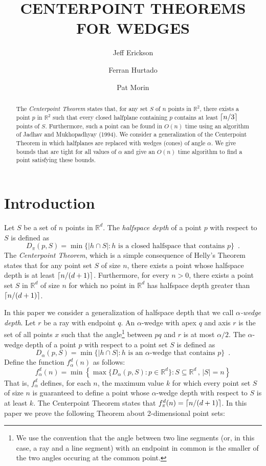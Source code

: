 \documentclass[lotsofwhite]{patmorin}
\title{\MakeUppercase{Centerpoint Theorems for Wedges}}
\author{Jeff Erickson \and
	Ferran Hurtado \and
	Pat Morin}
\date{}
\begin{document}
\maketitle

\begin{abstract}
The \emph{Centerpoint Theorem} states that, for any set $S$ of $n$
points in $\mathbb{R}^2$, there exists a point $p$ in $\mathbb{R}^2$
such that every closed halfplane containing $p$ contains at least
$\left\lceil n/3 \right\rceil$ points of $S$. Furthermore, such a point can be found in
$O(n)$ time using an algorithm of Jadhav and Mukhopadhyay (1994).  We
consider a generalization of the Centerpoint Theorem in which
halfplanes are replaced with wedges (cones) of angle $\alpha$.  We
give bounds that are tight for all values of $\alpha$ and give an
$O(n)$ time algorithm to find a point satisfying these bounds.
\end{abstract}

\section{Introduction}

Let $S$ be a set of $n$ points in $\mathbb{R}^d$.  The \emph{halfspace
depth} \cite{t75} of a point $p$ with respect to $S$ is defined as
\[
D_\pi(p,S) = 
   \min\{|h\cap S| : \mbox{$h$ is a closed halfspace that contains $p$} \}
    \enspace .
\]
The \emph{Centerpoint Theorem}, which is a simple consequence of
Helly's Theorem \cite{e93} states that for any point set $S$ of size
$n$, there exists a point whose halfspace depth is at least
$\left\lceil n/(d+1) \right\rceil$.  Furthermore, for every $n>0$, there exists a point
set $S$ in $\mathbb{R}^d$ of size $n$ for which no point in
$\mathbb{R}^d$ has halfspace depth greater than $\left\lceil n/(d+1) \right\rceil$. 

In this paper we consider a generalization of halfspace depth that we
call \emph{$\alpha$-wedge depth}. Let $r$ be a ray with endpoint $q$.
An $\alpha$-wedge with apex $q$ and axis $r$ is the set of all points
$x$ such that the angle\footnote{We use the convention that the angle
between two line segments (or, in this case, a ray and a line segment)
with an endpoint in common is the smaller of the two angles occuring
at the common point.} between $pq$ and $r$ is at most $\alpha/2$.  The
$\alpha$-wedge depth of a point $p$ with respect to a point set $S$ is
defined as
\[
D_\alpha(p,S) =
   \min\{|h\cap S| : \mbox{$h$ is an $\alpha$-wedge that contains $p$} \} 
   \enspace .
\]
Define the function $f^d_\alpha(n)$ as follows:
\[
   f^d_\alpha(n) = \min\left\{\max\{D_\alpha(p,S):p\in
\mathbb{R}^d\}: S\subseteq\mathbb{R}^d\, ,\, |S|=n\right\}
\]
That is, $f^d_\alpha$ defines, for each $n$, the maximum value $k$ for
which every point set $S$ of size $n$ is guaranteed to define a point
whose $\alpha$-wedge depth with respect to $S$ is at least $k$.  The
Centerpoint Theorem states that $f^d_\pi(n) = \left\lceil n/(d+1) \right\rceil$.  In this paper
we prove the following Theorem about 2-dimensional point sets:
\end{document}
